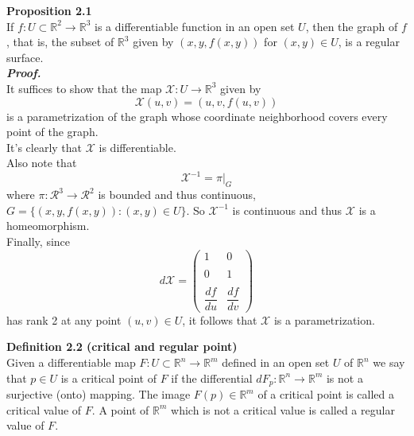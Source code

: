 \documentclass{article}
\begin{document}
\par
\textbf{Proposition 2.1}\\
If $f: U \subset \mathbb{R}^2 \to \mathbb{R}^3$ is a differentiable function in an open set $U$, then
the graph of $f$, that is, the subset of $\mathbb{R}^3$ given by $(x, y, f(x,y))$ for $(x,y) \in U$, is
a regular surface.\\
\textbf{\textit{Proof.}}\\
It suffices to show that the map $\mathcal{X}: U \to \mathbb{R}^3$ given by
$$
    \mathcal{X}(u,v) = (u,v,f(u,v))
$$
is a parametrization of the graph whose coordinate neighborhood covers every point
of the graph.\\
It's clearly that $\mathcal{X}$ is differentiable.\\
Also note that
$$
    \mathcal{X}^{-1} = \pi |_{G}
$$
where $\pi: \mathcal{R}^3 \to \mathcal{R}^2$ is bounded and thus continuous, $G=\{(x,y,f(x,y)): (x,y) \in U\}$. So $\mathcal{X}^{-1}$
is continuous and thus $\mathcal{X}$ is a homeomorphism.\\
Finally, since
$$
    d{\mathcal{X}} = 
    \left(\begin{array}{cc} 
        1 & 0 \\\\
        0 & 1 \\\\
        \dfrac{df}{du} & \dfrac{df}{dv}
    \end{array}\right)
$$
has rank 2 at any point $(u,v) \in U$, it follows that $\mathcal{X}$ is a parametrization.\quad \qedsymbol

\par
\textbf{Definition 2.2 (critical and regular point)}\\
Given a differentiable map $F: U \subset \mathbb{R}^n \to \mathbb{R}^m$ defined in an open set $U$ of $\mathbb{R}^n$ we
say that $p \in U$ is a critical point of $F$ if the differential $dF_p: \mathbb{R}^n \to \mathbb{R}^m$
is not a surjective (onto) mapping. The image $F(p) \in \mathbb{R}^m$ of a critical point is called a critical value of
$F$. A point of $\mathbb{R}^m$ which is not a critical value is called a regular value of $F$.
\end{document}
